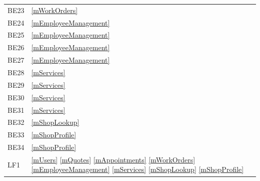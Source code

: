 \documentclass[12pt, titlepage]{article}
\begin{document}
\begin{longtable}{p{} p{}}
	BE23                  & \ref{mWorkOrders}                                                                                                                               \\
	BE24                  & \ref{mEmployeeManagement}                                                                                                                       \\
	BE25                  & \ref{mEmployeeManagement}                                                                                                                       \\
	BE26                  & \ref{mEmployeeManagement}                                                                                                                       \\
	BE27                  & \ref{mEmployeeManagement}                                                                                                                       \\
	BE28                  & \ref{mServices}                                                                                                                                 \\
	BE29                  & \ref{mServices}                                                                                                                                 \\
	BE30                  & \ref{mServices}                                                                                                                                 \\
	BE31                  & \ref{mServices}                                                                                                                                 \\
	BE32                  & \ref{mShopLookup}                                                                                                                               \\
	BE33                  & \ref{mShopProfile}                                                                                                                              \\
	BE34                  & \ref{mShopProfile}                                                                                                                              \\
	LF1                   & \ref{mUsers} \ref{mQuotes} \ref{mAppointments} \ref{mWorkOrders} \ref{mEmployeeManagement} \ref{mServices} \ref{mShopLookup} \ref{mShopProfile} \\

\end{longtable}
\end{document}

